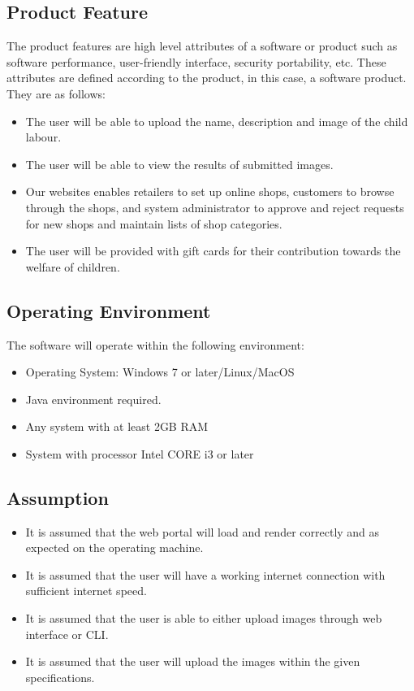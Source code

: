 \subsection{Product Feature}
The product features are high level attributes of a software or product such as software performance, user-friendly interface, security portability, etc. These attributes are defined according to the product, in this case, a software product.\\
They are as follows:
\begin{itemize}
\item The user will be able to upload the name, description and image of the child labour.
\item The user will be able to view the results of submitted images.
\item Our websites enables retailers to set up online shops, customers to browse through the shops, and system administrator to approve and reject requests for new shops and maintain lists of shop categories.
\item The user will be provided with gift cards for their contribution towards the welfare of children.
\end{itemize}

\subsection{Operating Environment}
The software will operate within the following environment:
\begin{itemize}
    \item  Operating System: Windows 7 or later/Linux/MacOS
    \item Java environment required.
    \item Any system with at least 2GB RAM
    \item System with processor Intel CORE i3 or later
\end{itemize}

\subsection{Assumption}

\begin{itemize}
\item It is assumed that the web portal will load and render correctly and as expected on the operating machine.
\item It is assumed that the user will have a working internet connection with sufficient internet speed.
\item It is assumed that the user is able to either upload images through web interface or CLI.
\item It is assumed that the user will upload the images within the given specifications.
\end{itemize}


